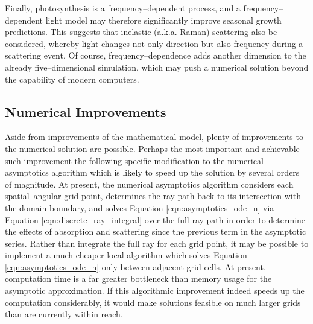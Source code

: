 Finally, photosynthesis is a frequency--dependent process, and a frequency--dependent light model may therefore significantly improve seasonal growth predictions.
This suggests that inelastic (a.k.a. Raman) scattering also be considered, whereby light changes not only direction but also frequency during a scattering event.
Of course, frequency--dependence adds another dimension to the already five--dimensional simulation, which may push a numerical solution beyond the capability of modern computers.

\subsection{Numerical Improvements}
Aside from improvements of the mathematical model, plenty of improvements to the numerical solution are possible.
Perhaps the most important and achievable such improvement the following specific modification to the numerical asymptotics algorithm which is likely to speed up the solution by several orders of magnitude.
At present, the numerical asymptotics algorithm considers each spatial--angular grid point, determines the ray path back to its intersection with the domain boundary, and solves Equation \eqref{eqn:asymptotics_ode_n} via Equation \eqref{eqn:discrete_ray_integral} over the full ray path in order to determine the effects of absorption and scattering since the previous term in the asymptotic series.
Rather than integrate the full ray for each grid point, it may be possible to implement a much cheaper local algorithm which solves Equation \eqref{eqn:asymptotics_ode_n} only between adjacent grid cells.
At present, computation time is a far greater bottleneck than memory usage for the asymptotic approximation.
If this algorithmic improvement indeed speeds up the computation considerably, it would make solutions feasible on much larger grids than are currently within reach.

